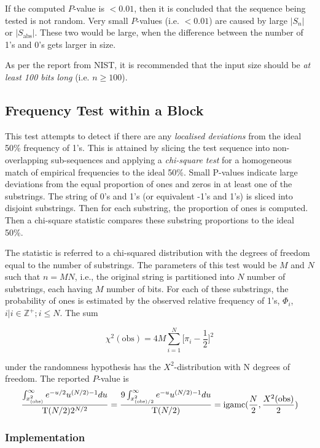 If the computed $P$-value is $< 0.01$, then it is concluded that the sequence being tested is not random. Very small $P$-values (i.e. $< 0.01$) are caused by large $\lvert S_n \rvert$ or $\lvert S_\text{abs} \rvert$. These two would be large, when the difference between the number of 1's and 0's gets larger in size.

As per the report from NIST, it is recommended that the input size should be \textit{at least 100 bits long} (i.e. $n \geq 100$).

\subsection{Frequency Test within a Block}

This test attempts to detect if there are any \textit{localised deviations} from the ideal 50\% frequency of 1's. This is attained by slicing the test sequence into non-overlapping sub-sequences and applying a \textit{chi-square test} for a homogeneous match of empirical frequencies to the ideal 50\%. Small P-values indicate large deviations from the equal proportion of ones and zeros in at least one of the substrings. The string of 0's and 1's (or equivalent -1's and 1's) is sliced into disjoint substrings. Then for each substring, the proportion of ones is computed. Then a chi-square statistic compares these substring proportions to the ideal 50\%.

The statistic is referred to a chi-squared distribution with the degrees of freedom equal to the number of substrings. The parameters of this test would be $M$ and $N$ such that $n = MN$, i.e., the original string is partitioned into $N$ number of substrings, each having $M$ number of bits. For each of these substrings, the probability of ones is estimated by the observed relative frequency of 1's, $\Phi_i$, ${i | i \in \mathbb{Z}^+; i \leq N}$. The sum

\[
    \chi^2(\text{obs}) = 4M\sum_{i=1}^{N}\bigg[ \pi_i - \dfrac{1}{2}\bigg]^2
\]

under the randomness hypothesis has the $Χ^2$-distribution with N degrees of freedom. The reported $P$-value is
\[
    \dfrac{\int_{x^2_{\text{(obs)}}}^\infty e^{-u/2}u^{(N/2)-1} du}{\mathrm{T}(N/2)2^{N/2}} = \dfrac{9\int_{x^2_{\text{(obs)}/2}}^\infty e^{-u}u^{(N/2)-1} du}{\mathrm{T}(N/2)} = \text{igamc}(\dfrac{N}{2}, \dfrac{X^2(\text{obs})}{2})
\]

\subsubsection{Implementation}

